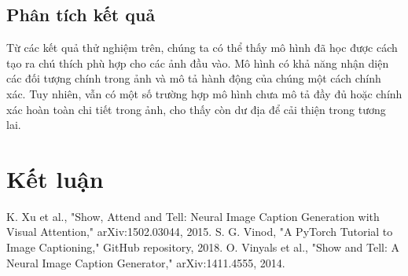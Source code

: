 \documentclass[conference]{IEEEtran}
\begin{document}
\subsection{Phân tích kết quả}
Từ các kết quả thử nghiệm trên, chúng ta có thể thấy mô hình đã học được cách tạo ra chú thích phù hợp cho các ảnh đầu vào. Mô hình có khả năng nhận diện các đối tượng chính trong ảnh và mô tả hành động của chúng một cách chính xác. Tuy nhiên, vẫn có một số trường hợp mô hình chưa mô tả đầy đủ hoặc chính xác hoàn toàn chi tiết trong ảnh, cho thấy còn dư địa để cải thiện trong tương lai.
\section{Kết luận}

\begin{thebibliography}{00}
 K. Xu et al., "Show, Attend and Tell: Neural Image Caption Generation with Visual Attention," arXiv:1502.03044, 2015.
 S. G. Vinod, "A PyTorch Tutorial to Image Captioning," GitHub repository, 2018.
 O. Vinyals et al., "Show and Tell: A Neural Image Caption Generator," arXiv:1411.4555, 2014.
\end{thebibliography}
\vspace{12pt}
\color{red}
\end{document}
